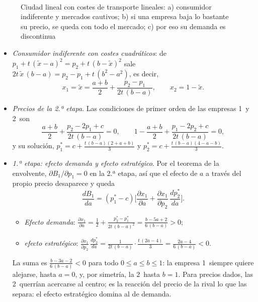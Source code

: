 \documentclass[11pt]{article}
\begin{document}
\begin{figure}[H]
\centering
\caption{Ciudad lineal con costes de transporte lineales: a) consumidor indiferente y mercados cautivos; b) si una empresa baja lo bastante su precio, se queda con todo el mercado; c) por eso su demanda es discontinua}\label{fig:hotelling-discontinuidad}
\\[6pt]
\end{figure}

\begin{itemize}
\item \emph{Consumidor indiferente con costes cuadráticos}: de $p_1+t\,(\tilde{x}-a)^2=p_2+t\,(b-\tilde{x})^2$ sale $2t\,\tilde{x}\,(b-a)=p_2-p_1+t\,(b^2-a^2)$, es decir,
  $$x_1=\tilde{x}=\frac{a+b}{2}+\frac{p_2-p_1}{2t\,(b-a)},\qquad x_2=1-\tilde{x}.$$
\item \emph{Precios de la 2.ª etapa}. Las condiciones de primer orden de las empresas 1~y 2~son
  $$\frac{a+b}{2}+\frac{p_2-2p_1+c}{2t\,(b-a)}=0,\qquad 1-\frac{a+b}{2}+\frac{p_1-2p_2+c}{2t\,(b-a)}=0,$$
  y su solución, $p_1^*=c+\frac{t\,(b-a)(2+a+b)}{3}$ y $p_2^*=c+\frac{t\,(b-a)(4-a-b)}{3}$.\findemo
\item \emph{1.ª etapa: efecto demanda y efecto estratégico}. Por el teorema de la envolvente, $\partial B_1/\partial p_1=0$ en la 2.ª etapa, así que el efecto de $a$ a través del propio precio desaparece y queda
  $$\frac{dB_1}{da}=(p_1^*-c)\Big[\frac{\partial x_1}{\partial a}+\frac{\partial x_1}{\partial p_2}\,\frac{dp_2^*}{da}\Big].$$
  \begin{itemize}
  \item \emph{Efecto demanda}: $\frac{\partial x_1}{\partial a}=\frac{1}{2}+\frac{p_2^*-p_1^*}{2t\,(b-a)^2}=\frac{b-5a+2}{6\,(b-a)}>0$;
  \item \emph{efecto estratégico}: $\frac{\partial x_1}{\partial p_2}\,\frac{dp_2^*}{da}=\frac{1}{2t\,(b-a)}\cdot\frac{t\,(2a-4)}{3}=\frac{2a-4}{6\,(b-a)}<0$.
  \end{itemize}
  La suma es $\frac{b-3a-2}{6\,(b-a)}<0$ para todo $0\le a\le b\le1$: la empresa 1~siempre quiere alejarse, hasta $a=0$, y, por simetría, la 2~hasta $b=1$. Para precios dados, las 2~querrían acercarse al centro; es la reacción del precio de la rival lo que las separa: el efecto estratégico domina al de demanda.\findemo
\end{itemize}
\end{document}
